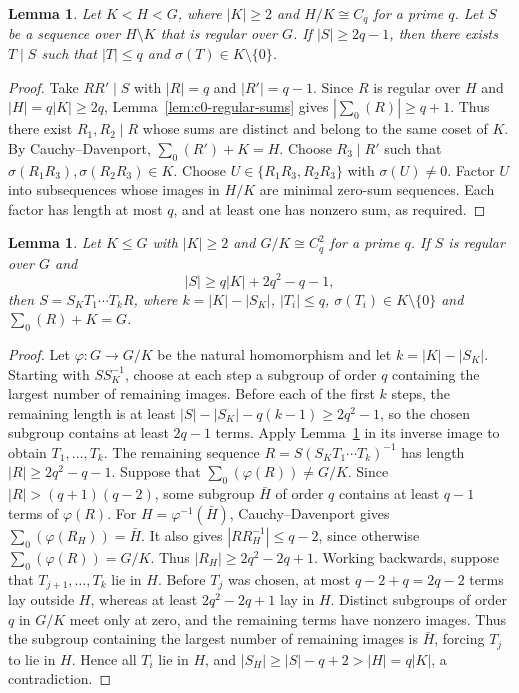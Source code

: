 \documentclass[10pt,reqno]{amsart}
\newtheorem{lem}[thm]{Lemma}
\theoremstyle{definition}
\theoremstyle{remark}
\numberwithin{equation}{section}
\begin{document}
\begin{lem}\label{lem:c0-short-block}
Let $K<H<G$, where $|K|\ge2$ and $H/K\cong C_q$ for a prime $q$.
Let $S$ be a sequence over $H\setminus K$ that is regular over $G$.
If $|S|\ge2q-1$, then there exists $T\mid S$ such that
$|T|\le q$ and $\sigma(T)\in K\setminus\{0\}$.
\end{lem}

\begin{proof}
Take $RR'\mid S$ with $|R|=q$ and $|R'|=q-1$.
Since $R$ is regular over $H$ and $|H|=q|K|\ge2q$,
Lemma~\ref{lem:c0-regular-sums} gives $|\sum_0(R)|\ge q+1$.
Thus there exist $R_1,R_2\mid R$ whose sums are distinct and belong to the same coset of $K$.
By Cauchy--Davenport, $\sum_0(R')+K=H$.
Choose $R_3\mid R'$ such that $\sigma(R_1R_3),\sigma(R_2R_3)\in K$.
Choose $U\in\{R_1R_3,R_2R_3\}$ with $\sigma(U)\ne0$.
Factor $U$ into subsequences whose images in $H/K$ are minimal zero-sum sequences.
Each factor has length at most $q$, and at least one has nonzero sum, as required.
\end{proof}

\begin{lem}\label{lem:c0-decomposition}
Let $K\le G$ with $|K|\ge2$ and $G/K\cong C_q^2$ for a prime $q$.
If $S$ is regular over $G$ and
\[
|S|\ge q|K|+2q^2-q-1,
\]
then $S=S_KT_1\cdots T_kR$, where $k=|K|-|S_K|$,
$|T_i|\le q$, $\sigma(T_i)\in K\setminus\{0\}$ and $\sum_0(R)+K=G$.
\end{lem}

\begin{proof}
Let $\varphi:G\to G/K$ be the natural homomorphism and let $k=|K|-|S_K|$.
Starting with $SS_K^{-1}$, choose at each step a subgroup of order $q$ containing the largest number of remaining images.
Before each of the first $k$ steps, the remaining length is at least
$|S|-|S_K|-q(k-1)\ge2q^2-1$, so the chosen subgroup contains at least $2q-1$ terms.
Apply Lemma~\ref{lem:c0-short-block} in its inverse image to obtain $T_1,\ldots,T_k$.
The remaining sequence $R=S(S_KT_1\cdots T_k)^{-1}$ has length
$|R|\ge2q^2-q-1$.
Suppose that $\sum_0(\varphi(R))\ne G/K$.
Since $|R|>(q+1)(q-2)$, some subgroup $\bar H$ of order $q$ contains at least $q-1$ terms of $\varphi(R)$.
For $H=\varphi^{-1}(\bar H)$, Cauchy--Davenport gives $\sum_0(\varphi(R_H))=\bar H$.
It also gives $|RR_H^{-1}|\le q-2$, since otherwise $\sum_0(\varphi(R))=G/K$.
Thus $|R_H|\ge2q^2-2q+1$.
Working backwards, suppose that $T_{j+1},\ldots,T_k$ lie in $H$.
Before $T_j$ was chosen, at most $q-2+q=2q-2$ terms lay outside $H$,
whereas at least $2q^2-2q+1$ lay in $H$.
Distinct subgroups of order $q$ in $G/K$ meet only at zero,
and the remaining terms have nonzero images. Thus the subgroup containing
the largest number of remaining images is $\bar H$, forcing $T_j$ to lie in $H$.
Hence all $T_i$ lie in $H$, and $|S_H|\ge|S|-q+2>|H|=q|K|$, a contradiction.
\end{proof}
\end{document}
